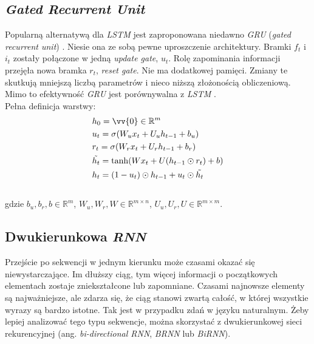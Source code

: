 
\subsection{\textit{Gated Recurrent Unit}}
Popularną alternatywą dla \textit{LSTM} jest zaproponowana niedawno \textit{GRU} (\textit{gated recurrent unit}) \cite{encdec}. Niesie ona ze sobą pewne uproszczenie architektury. Bramki $f_t$ i $i_t$ zostały połączone w jedną \textit{update gate}, $u_t$. Rolę zapominania informacji przejęła nowa bramka $r_t$, \textit{reset gate}. Nie ma dodatkowej pamięci. Zmiany te skutkują mniejszą liczbą parametrów i nieco niższą złożonością obliczeniową. Mimo to efektywność \textit{GRU} jest porównywalna z \textit{LSTM} \cite{gatesvstanh}.
\\
Pełna definicja warstwy:
\[
\begin{aligned}
    & h_0 = \vv{0} \in \mathbb{R}^m \\
    & u_t = \sigma(W_u x_t + U_u h_{t-1} + b_u) \\
    & r_t = \sigma(W_r x_t + U_r h_{t-1} + b_r) \\
    & \tilde{h_t} = \tanh (W x_t + U (h_{t-1} \odot r_t)  + b) \\
    & h_t = (1 - u_t) \odot h_{t-1} + u_t \odot \tilde{h_t}
\end{aligned}
\]
\\
gdzie $b_u, b_r, b \in \mathbb{R}^m$, $W_u, W_r, W \in \mathbb{R}^{m \times n}$, $U_u, U_r, U \in \mathbb{R}^{m \times m}$.


\subsection{Dwukierunkowa \textit{RNN}} \label{birnn}
Przejście po sekwencji w jednym kierunku może czasami okazać się niewystarczające. Im dłuższy ciąg, tym więcej informacji o początkowych elementach zostaje zniekształcone lub zapomniane. Czasami najnowsze elementy są najważniejsze, ale zdarza się, że ciąg stanowi zwartą całość, w której wszystkie wyrazy są bardzo istotne. Tak jest w przypadku zdań w języku naturalnym. Żeby lepiej analizować tego typu sekwencje, można skorzystać z dwukierunkowej sieci rekurencyjnej (ang. \textit{bi-directional RNN}, \textit{BRNN} lub \textit{BiRNN}).

